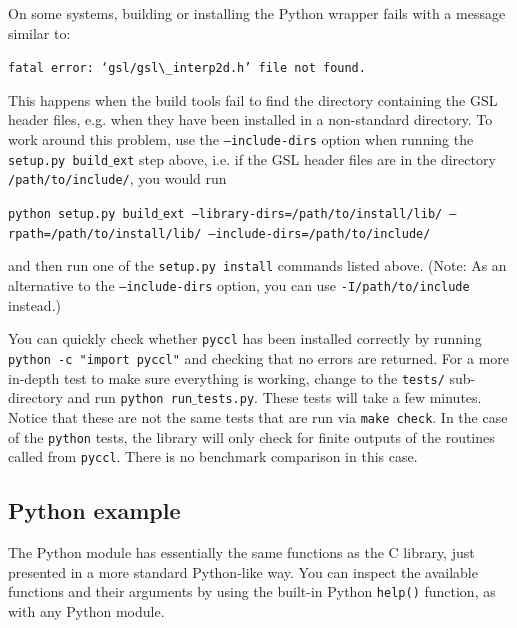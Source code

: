 \documentclass[\docopts]{\docclass}
\begin{document}
On some systems, building or installing the Python wrapper fails with a message similar to:

\texttt{fatal error: `gsl/gsl$\_$interp2d.h' file not found.}

This happens when the build tools fail to find the directory containing the GSL header files, e.g. when they have been installed in a non-standard directory. To work around this problem, use the {\tt --include-dirs} option when running the {\tt setup.py build$\_$ext} step above, i.e. if the GSL header files are in the directory {\tt /path/to/include/}, you would run

\texttt{python setup.py build$\_$ext --library-dirs=/path/to/install/lib/ --rpath=/path/to/install/lib/ --include-dirs=/path/to/include/}

and then run one of the {\tt setup.py install} commands listed above. (Note: As an alternative to the {\tt --include-dirs} option, you can use {\tt -I/path/to/include} instead.)

You can quickly check whether {\tt pyccl} has been installed correctly by running {\tt python -c "import pyccl"} and checking that no errors are returned. For a more in-depth test to make sure everything is working, change to the {\tt tests/} sub-directory and run {\tt python run$\_$tests.py}. These tests will take a few minutes. Notice that these are not the same tests that are run via {\tt make check}. In the case of the {\tt python} tests, the library will only check for finite outputs of the routines called from {\tt pyccl}. There is no benchmark comparison in this case.

\subsection{Python example}
\label{sec:python:example}

The Python module has essentially the same functions as the C library, just presented in a more standard Python-like way. You can inspect the available functions and their arguments by using the built-in Python {\tt help()} function, as with any Python module.
\end{document}
